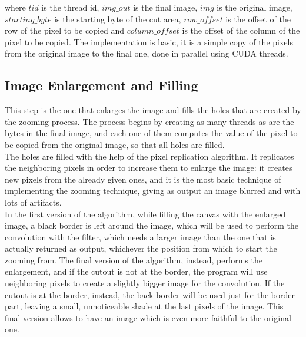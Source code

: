     where $tid$ is the thread id, $img\_out$ is the final image, $img$ is the original image, $starting\_byte$ is the starting byte of the cut area, 
    $row\_offset$ is the offset of the row of the pixel to be copied and $column\_offset$ is the offset of the column of the pixel to be copied.
    The implementation is basic, it is a simple copy of the pixels from the original image to the final one, done in parallel using CUDA threads.\\

    \subsection{Image Enlargement and Filling}
    This step is the one that enlarges the image and fills the holes that are created by the zooming process.
    The process begins by creating as many threads as are the bytes in the final image, and each one of them computes 
    the value of the pixel to be copied from the original image, so that all holes are filled.\\
    The holes are filled with the help of the pixel replication algorithm. 
    It replicates the neighboring pixels in order to increase them to enlarge the image: it creates new pixels from the already given ones, 
    and it is the most basic technique of implementing the zooming technique, giving as output an image blurred and with lots of artifacts.\\ 
    In the first version of the algorithm, while filling the canvas with the enlarged image, a black border is left around the image,
    which will be used to perform the convolution with the filter, which needs a larger image than the one that is actually returned as output, whichever
    the position from which to start the zooming from.
    The final version of the algorithm, instead, performs the enlargement, and if the cutout is not at the border, the program will use neighboring pixels
    to create a slightly bigger image for the convolution. If the cutout is at the border, instead, the back border will be used just for the border part, 
    leaving a small, unnoticeable shade at the last pixels of the image. This final version allows to have an image which is even more faithful to the original one.\\




